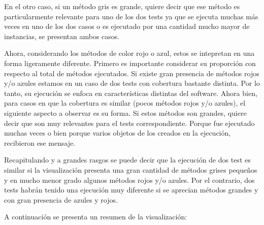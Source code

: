 \par En el otro caso, si un método gris es grande, quiere decir que ese método es particularmente relevante para uno de los dos tests ya que se ejecuta muchas más veces en uno de los dos casos o es ejecutado por una cantidad mucho mayor de instancias, se presentan ambos casos. 

\par Ahora, considerando los métodos de color rojo o azul, estos se intepretan en una forma ligeramente diferente. Primero es importante considerar su proporción con respecto al total de métodos ejecutados. Si existe gran presencia de métodos rojos y/o azules estamos en un caso de dos tests con cobertura bastante distinta. Por lo tanto, su ejecución se enfoca en características distintas del software. Ahora bien, para casos en que la cobertura es similar (pocos métodos rojos y/o azules), el siguiente aspecto a observar es su forma. Si estos métodos son grandes, quiere decir que son muy relevantes para el tests correspondiente. Porque fue ejecutado muchas veces o bien porque varios objetos de los creados en la ejecución, recibieron ese mensaje.

\par Recapitulando y a grandes rasgos se puede decir que la ejecución de dos test es similar si la visualización presenta una gran cantidad de métodos grises pequeños y en mucho menor grado algunos métodos rojos y/o azules. Por el contrario, dos tests habrán tenido una ejecución muy diferente si se aprecian métodos grandes y con gran presencia de azules y rojos. 

\par A continuación se presenta un resumen de la visualización:


